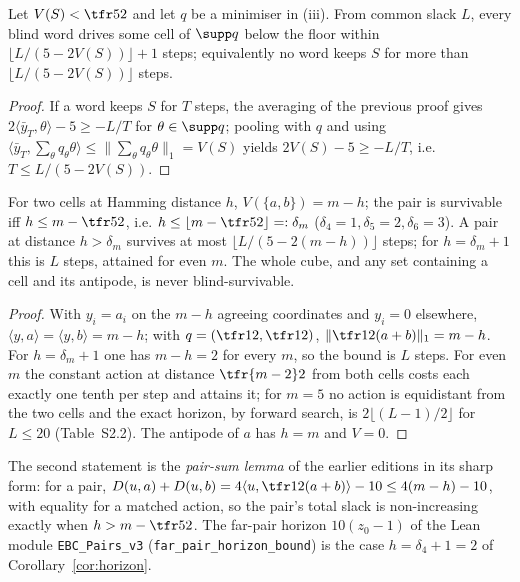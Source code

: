 \begin{corollary}\label{cor:horizon}
Let $V(S)<\tfr52$ and let $q$ be a minimiser in (iii). From common slack $L$, every blind word drives some cell of $\supp q$ below the floor within $\lfloor L/(5-2V(S))\rfloor+1$ steps; equivalently no word keeps $S$ for more than $\lfloor L/(5-2V(S))\rfloor$ steps.
\end{corollary}
\begin{proof}
If a word keeps $S$ for $T$ steps, the averaging of the previous proof gives $2\langle\bar y_T,\theta\rangle-5\ge-L/T$ for $\theta\in\supp q$; pooling with $q$ and using $\langle\bar y_T,\sum_\theta q_\theta\theta\rangle\le\|\sum_\theta q_\theta\theta\|_1=V(S)$ yields $2V(S)-5\ge-L/T$, i.e. $T\le L/(5-2V(S))$.
\end{proof}

\begin{corollary}[pairs]\label{cor:pairs}
For two cells at Hamming distance $h$, $V(\{a,b\})=m-h$; the pair is survivable iff $h\le m-\tfr52$, i.e. $h\le\lfloor m-\tfr52\rfloor=:\delta_m$ ($\delta_4=1,\delta_5=2,\delta_6=3$). A pair at distance $h>\delta_m$ survives at most $\lfloor L/(5-2(m-h))\rfloor$ steps; for $h=\delta_m+1$ this is $L$ steps, attained for even $m$. The whole cube, and any set containing a cell and its antipode, is never blind-survivable.
\end{corollary}
\begin{proof}
With $y_i=a_i$ on the $m-h$ agreeing coordinates and $y_i=0$ elsewhere, $\langle y,a\rangle=\langle y,b\rangle=m-h$; with $q=(\tfr12,\tfr12)$, $\|\tfr12(a+b)\|_1=m-h$. For $h=\delta_m+1$ one has $m-h=2$ for every $m$, so the bound is $L$ steps. For even $m$ the constant action at distance $\tfr{m-2}2$ from both cells costs each exactly one tenth per step and attains it; for $m=5$ no action is equidistant from the two cells and the exact horizon, by forward search, is $2\lfloor(L-1)/2\rfloor$ for $L\le20$ (Table~S2.2). The antipode of $a$ has $h=m$ and $V=0$.
\end{proof}

The second statement is the \emph{pair-sum lemma} of the earlier editions in its sharp form: for a pair, $D(u,a)+D(u,b)=4\langle u,\tfr12(a+b)\rangle-10\le4(m-h)-10$, with equality for a matched action, so the pair's total slack is non-increasing exactly when $h>m-\tfr52$. The far-pair horizon $10(z_0-1)$ of the Lean module \texttt{EBC\_Pairs\_v3} (\texttt{far\_pair\_horizon\_bound}) is the case $h=\delta_4+1=2$ of Corollary~\ref{cor:horizon}.

